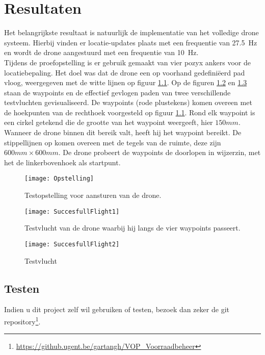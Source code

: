 \chapter{Resultaten}
Het belangrijkste resultaat is natuurlijk de implementatie van het volledige drone systeem. Hierbij vinden er locatie-updates plaats met een frequentie van \SI{27.5}{\Hz} en wordt de drone aangestuurd met een frequentie van \SI{10}{\Hz}.\\

Tijdens de proefopstelling is er gebruik gemaakt van vier pozyx ankers voor de locatiebepaling. Het doel was dat de drone een op voorhand gedefini\"eerd pad vloog, weergegeven met de witte lijnen op figuur \ref{fig:Opstelling}. Op de figuren \ref{fig:SuccesfullFlight1} en  \ref{fig:SuccesfullFlight2} staan de waypoints en de effectief gevlogen paden van twee verschillende testvluchten gevisualiseerd. De waypoints (rode plustekens) komen overeen met de hoekpunten van de rechthoek voorgesteld op figuur \ref{fig:Opstelling}. Rond elk waypoint is een cirkel getekend die de grootte van het waypoint weergeeft, hier $150mm$. Wanneer de drone binnen dit bereik valt, heeft hij het waypoint bereikt. De stippellijnen op komen overeen met de tegels van de ruimte, deze zijn $600mm \times 600mm$. De drone probeert de waypoints de doorlopen in wijzerzin, met het de linkerbovenhoek als startpunt. 

\begin{figure}[p]
	\centering
	\texttt{[image: Opstelling]}
	\caption[Opstelling testvluchten]{Testopstelling voor aansturen van de drone.}
	\label{fig:Opstelling}
\end{figure}

\begin{figure}[p]	
	\centering
	\texttt{[image: SuccesfullFlight1]}
	\caption[Testvlucht1]{Testvlucht van de drone waarbij hij langs de vier waypoints passeert. }
	\label{fig:SuccesfullFlight1}
\end{figure}
	
\begin{figure}[p]
	\centering
	\texttt{[image: SuccesfullFlight2]}
	\caption[Testvlucht2]{Testvlucht}
	\label{fig:SuccesfullFlight2}
	
\end{figure}

\section{Testen} \label{sec:test}
Indien u dit project zelf wil gebruiken of testen, bezoek dan zeker de git repository\footnote{\url{https://github.ugent.be/gartangh/VOP_Voorraadbeheer}}.

